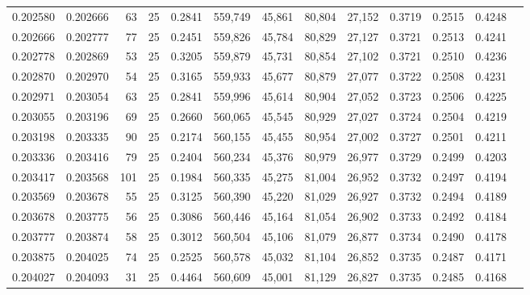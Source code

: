 \begin{tabular}{rrrrrrrrrrrrr}
0.202580 & 0.202666 &    63 &  25 &                                     0.2841 & 559,749 &  45,861 &  80,804 &  27,152 & 0.3719 & 0.2515 & 0.4248 \\
0.202666 & 0.202777 &    77 &  25 &                                     0.2451 & 559,826 &  45,784 &  80,829 &  27,127 & 0.3721 & 0.2513 & 0.4241 \\
0.202778 & 0.202869 &    53 &  25 &                                     0.3205 & 559,879 &  45,731 &  80,854 &  27,102 & 0.3721 & 0.2510 & 0.4236 \\
0.202870 & 0.202970 &    54 &  25 &                                     0.3165 & 559,933 &  45,677 &  80,879 &  27,077 & 0.3722 & 0.2508 & 0.4231 \\
0.202971 & 0.203054 &    63 &  25 &                                     0.2841 & 559,996 &  45,614 &  80,904 &  27,052 & 0.3723 & 0.2506 & 0.4225 \\
0.203055 & 0.203196 &    69 &  25 &                                     0.2660 & 560,065 &  45,545 &  80,929 &  27,027 & 0.3724 & 0.2504 & 0.4219 \\
0.203198 & 0.203335 &    90 &  25 &                                     0.2174 & 560,155 &  45,455 &  80,954 &  27,002 & 0.3727 & 0.2501 & 0.4211 \\
0.203336 & 0.203416 &    79 &  25 &                                     0.2404 & 560,234 &  45,376 &  80,979 &  26,977 & 0.3729 & 0.2499 & 0.4203 \\
0.203417 & 0.203568 &   101 &  25 &                                     0.1984 & 560,335 &  45,275 &  81,004 &  26,952 & 0.3732 & 0.2497 & 0.4194 \\
0.203569 & 0.203678 &    55 &  25 &                                     0.3125 & 560,390 &  45,220 &  81,029 &  26,927 & 0.3732 & 0.2494 & 0.4189 \\
0.203678 & 0.203775 &    56 &  25 &                                     0.3086 & 560,446 &  45,164 &  81,054 &  26,902 & 0.3733 & 0.2492 & 0.4184 \\
0.203777 & 0.203874 &    58 &  25 &                                     0.3012 & 560,504 &  45,106 &  81,079 &  26,877 & 0.3734 & 0.2490 & 0.4178 \\
0.203875 & 0.204025 &    74 &  25 &                                     0.2525 & 560,578 &  45,032 &  81,104 &  26,852 & 0.3735 & 0.2487 & 0.4171 \\
0.204027 & 0.204093 &    31 &  25 &                                     0.4464 & 560,609 &  45,001 &  81,129 &  26,827 & 0.3735 & 0.2485 & 0.4168 \\

\end{tabular}
